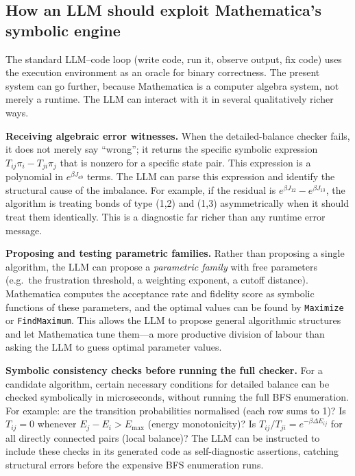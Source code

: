\documentclass[10.5pt]{article}
\begin{document}
\subsection*{How an LLM should exploit Mathematica's symbolic engine}

The standard LLM--code loop (write code, run it, observe output, fix
code) uses the execution environment as an oracle for binary
correctness.  The present system can go further, because Mathematica is
a computer algebra system, not merely a runtime.  The LLM can interact
with it in several qualitatively richer ways.

\textbf{Receiving algebraic error witnesses.}  When the detailed-balance
checker fails, it does not merely say ``wrong''; it returns the specific
symbolic expression $T_{ij}\pi_i - T_{ji}\pi_j$ that is nonzero for
a specific state pair.  This expression is a polynomial in $e^{\beta
J_{ab}}$ terms.  The LLM can parse this expression and identify the
structural cause of the imbalance.  For example, if the residual is
$e^{\beta J_{12}} - e^{\beta J_{13}}$, the algorithm is treating bonds
of type (1,2) and (1,3) asymmetrically when it should treat them
identically.  This is a diagnostic far richer than any runtime error
message.

\textbf{Proposing and testing parametric families.}  Rather than
proposing a single algorithm, the LLM can propose a \emph{parametric
family} with free parameters (e.g.\ the frustration threshold, a
weighting exponent, a cutoff distance).  Mathematica computes the
acceptance rate and fidelity score as symbolic functions of these
parameters, and the optimal values can be found by \texttt{Maximize} or
\texttt{FindMaximum}.  This allows the LLM to propose general
algorithmic structures and let Mathematica tune them---a more productive
division of labour than asking the LLM to guess optimal parameter values.

\textbf{Symbolic consistency checks before running the full checker.}
For a candidate algorithm, certain necessary conditions for detailed
balance can be checked symbolically in microseconds, without running the
full BFS enumeration.  For example: are the transition probabilities
normalised (each row sums to 1)?  Is $T_{ij} = 0$ whenever $E_j -
E_i > E_\text{max}$ (energy monotonicity)?  Is $T_{ij}/T_{ji} =
e^{-\beta\Delta E_{ij}}$ for all directly connected pairs (local balance)?
The LLM can be instructed to include these checks in its generated code
as self-diagnostic assertions, catching structural errors before the
expensive BFS enumeration runs.
\end{document}
